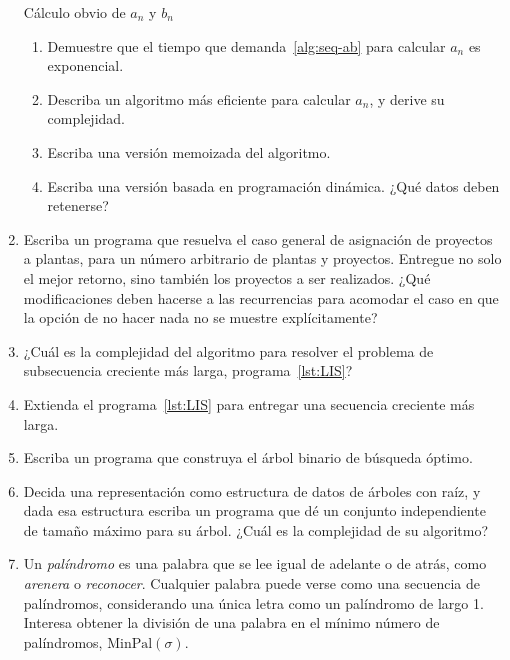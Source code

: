 \begin{enumerate}
\begin{algorithm}
      \caption{Cálculo obvio de \(a_n\) y \(b_n\)}
      \label{alg:seq-ab}
    \end{algorithm}
    \begin{enumerate}
    \item
      Demuestre que el tiempo que demanda~\ref{alg:seq-ab}
      para calcular \(a_n\) es exponencial.
    \item
      Describa un algoritmo más eficiente para calcular \(a_n\),
      y derive su complejidad.
    \item
      Escriba una versión memoizada del algoritmo.
    \item
      Escriba una versión basada en programación dinámica.
      ¿Qué datos deben retenerse?
    \end{enumerate}
  \item
    Escriba un programa que resuelva
    el caso general de asignación de proyectos a plantas,
    para un número arbitrario de plantas y proyectos.
    Entregue no solo el mejor retorno,
    sino también los proyectos a ser realizados.
    ¿Qué modificaciones deben hacerse a las recurrencias
    para acomodar el caso en que la opción de no hacer nada
    no se muestre explícitamente?
  \item
    ¿Cuál es la complejidad del algoritmo
    para resolver el problema de subsecuencia creciente más larga,
    programa~\ref{lst:LIS}?
  \item
    Extienda el programa~\ref{lst:LIS}
    para entregar una secuencia creciente más larga.
  \item
    Escriba un programa que construya el árbol binario de búsqueda óptimo.
  \item
    Decida una representación como estructura de datos de árboles con raíz,
    y dada esa estructura escriba un programa que dé un conjunto independiente
    de tamaño máximo para su árbol.
    ¿Cuál es la complejidad de su algoritmo?
  \item
    Un \emph{palíndromo} es una palabra
    que se lee igual de adelante o de atrás,
    como \emph{arenera} o \emph{reconocer}.
    Cualquier palabra puede verse como una secuencia de palíndromos,
    considerando una única letra como un palíndromo de largo \num{1}.
    Interesa obtener la división de una palabra
    en el mínimo número de palíndromos,
    \(\mathrm{MinPal}(\sigma)\).
    \begin{enumerate}

\end{enumerate}
\end{enumerate}
